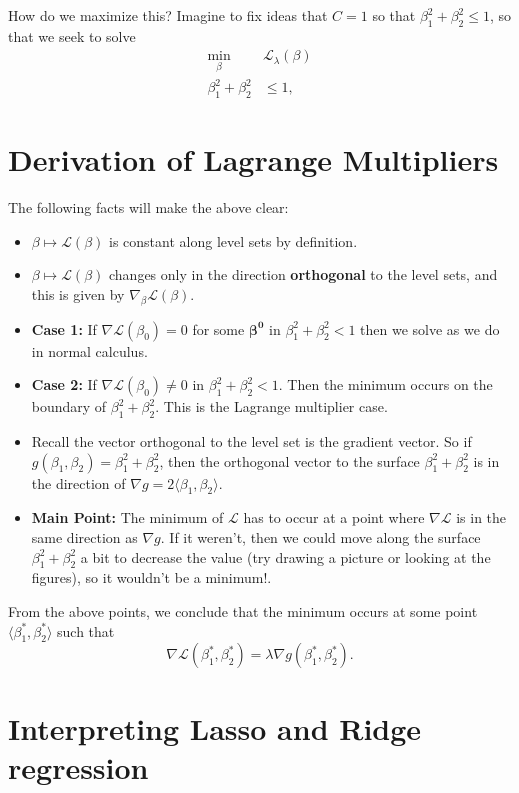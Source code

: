 \documentclass[paper=a4, fontsize=11pt]{scrartcl} %
\numberwithin{equation}{section} %
\numberwithin{figure}{section} %
\numberwithin{table}{section} %
\begin{document}
How do we maximize this? Imagine to fix ideas that $C=1$ so that $\beta_1^2 + \beta_2^2 \leq 1$, so that we seek to solve
\begin{align}
\min_{\beta} \; &\mathcal{L}_{\lambda} (\beta) \\
\beta_1^2 + \beta_2^2 &\leq 1,
\end{align}

\section{Derivation of Lagrange Multipliers}

The following facts will make the above clear:
\begin{itemize}
\item $ \beta \mapsto \mathcal{L}(\beta)$ is constant along level sets by definition.
\item $ \beta \mapsto \mathcal{L}(\beta)$ changes only in the direction \textbf{orthogonal} to the level sets, and this is given by $\nabla_{\beta} \mathcal{L}(\beta)$. 
\item \textbf{Case 1:} If $\nabla \mathcal{L}(\beta_0) = 0$ for some $\mathbf{\beta^0}$ in $\beta_1^2 + \beta_2^2 < 1$ then we solve as we do in normal calculus. 
\item  \textbf{Case 2:} If $\nabla \mathcal{L}(\beta_0) \neq 0$ in $\beta_1^2 + \beta_2^2 < 1$. Then the minimum occurs on the boundary of $\beta_1^2 + \beta_2^2$. This is the Lagrange multiplier case.
\item Recall the vector orthogonal to the level set is the gradient vector. So if $g(\beta_1,\beta_2) = \beta_1^2 + \beta_2^2$, then the orthogonal vector to the surface $\beta_1^2 + \beta_2^2$ is in the direction
of $\nabla g = 2\langle \beta_1, \beta_2 \rangle$.
\item \textbf{Main Point:} The minimum of $\mathcal{L}$ has to occur at a point where $\nabla \mathcal {L}$ is in the same direction as $\nabla g$. If it weren't, then we could move along the surface $\beta_1^2 + \beta_2^2$ a bit
to decrease the value (try drawing a picture or looking at the figures), so it wouldn't be a minimum!.
\end{itemize}

From the above points, we conclude that the minimum occurs at some point $\langle \beta_1^*, \beta_2^* \rangle$ such that
\[ \nabla \mathcal{L}(\beta_1^*, \beta_2^*) = \lambda \nabla g(\beta_1^*, \beta_2^*). \]

\section{Interpreting Lasso and Ridge regression}
\end{document}
